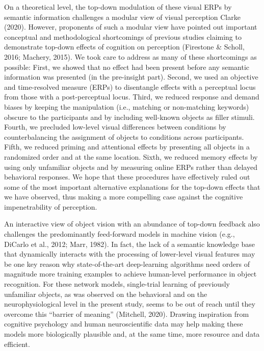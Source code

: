 \documentclass[
  english,
  doc,12pt,twoside,floatsintext]{apa7}
\begin{document}
On a theoretical level, the top-down modulation of these visual ERPs by semantic information challenges a modular view of visual perception Clarke (2020). However, proponents of such a modular view have pointed out important conceptual and methodological shortcomings of previous studies claiming to demonstrate top-down effects of cognition on perception (Firestone \& Scholl, 2016; Machery, 2015). We took care to address as many of these shortcomings as possible: First, we showed that no effect had been present before any semantic information was presented (in the pre-insight part). Second, we used an objective and time-resolved measure (ERPs) to disentangle effects with a perceptual locus from those with a post-perceptual locus. Third, we reduced response and demand biases by keeping the manipulation (i.e., matching or non-matching keywords) obscure to the participants and by including well-known objects as filler stimuli. Fourth, we precluded low-level visual differences between conditions by counterbalancing the assignment of objects to conditions across participants. Fifth, we reduced priming and attentional effects by presenting all objects in a randomized order and at the same location. Sixth, we reduced memory effects by using only unfamiliar objects and by measuring online ERPs rather than delayed behavioral responses. We hope that these procedures have effectively ruled out some of the most important alternative explanations for the top-down effects that we have observed, thus making a more compelling case against the cognitive impenetrability of perception.

An interactive view of object vision with an abundance of top-down feedback also challenges the predominantly feed-forward models in machine vision (e.g., DiCarlo et al., 2012; Marr, 1982). In fact, the lack of a semantic knowledge base that dynamically interacts with the processing of lower-level visual features may be one key reason why state-of-the-art deep-learning algorithms need orders of magnitude more training examples to achieve human-level performance in object recognition. For these network models, single-trial learning of previously unfamiliar objects, as was observed on the behavioral and on the neurophysiological level in the present study, seems to be out of reach until they overcome this ``barrier of meaning'' (Mitchell, 2020). Drawing inspiration from cognitive psychology and human neuroscientific data may help making these models more biologically plausible and, at the same time, more resource and data efficient.
\end{document}
